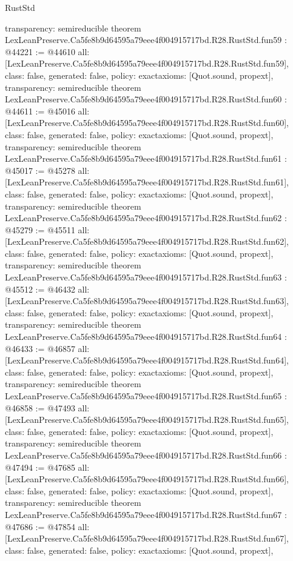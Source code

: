\begin{lexlean}{RustStd}
\begin{coremodule}
{  transparency: semireducible
}
theorem LexLeanPreserve.Ca5fe8b9d64595a79eee4f004915717bd.R28.RustStd.fun59 : @44221 := @44610 {
  all: [LexLeanPreserve.Ca5fe8b9d64595a79eee4f004915717bd.R28.RustStd.fun59],
  class: false,
  generated: false,
  policy: exact{axioms: [Quot.sound, propext]},
  transparency: semireducible
}
theorem LexLeanPreserve.Ca5fe8b9d64595a79eee4f004915717bd.R28.RustStd.fun60 : @44611 := @45016 {
  all: [LexLeanPreserve.Ca5fe8b9d64595a79eee4f004915717bd.R28.RustStd.fun60],
  class: false,
  generated: false,
  policy: exact{axioms: [Quot.sound, propext]},
  transparency: semireducible
}
theorem LexLeanPreserve.Ca5fe8b9d64595a79eee4f004915717bd.R28.RustStd.fun61 : @45017 := @45278 {
  all: [LexLeanPreserve.Ca5fe8b9d64595a79eee4f004915717bd.R28.RustStd.fun61],
  class: false,
  generated: false,
  policy: exact{axioms: [Quot.sound, propext]},
  transparency: semireducible
}
theorem LexLeanPreserve.Ca5fe8b9d64595a79eee4f004915717bd.R28.RustStd.fun62 : @45279 := @45511 {
  all: [LexLeanPreserve.Ca5fe8b9d64595a79eee4f004915717bd.R28.RustStd.fun62],
  class: false,
  generated: false,
  policy: exact{axioms: [Quot.sound, propext]},
  transparency: semireducible
}
theorem LexLeanPreserve.Ca5fe8b9d64595a79eee4f004915717bd.R28.RustStd.fun63 : @45512 := @46432 {
  all: [LexLeanPreserve.Ca5fe8b9d64595a79eee4f004915717bd.R28.RustStd.fun63],
  class: false,
  generated: false,
  policy: exact{axioms: [Quot.sound, propext]},
  transparency: semireducible
}
theorem LexLeanPreserve.Ca5fe8b9d64595a79eee4f004915717bd.R28.RustStd.fun64 : @46433 := @46857 {
  all: [LexLeanPreserve.Ca5fe8b9d64595a79eee4f004915717bd.R28.RustStd.fun64],
  class: false,
  generated: false,
  policy: exact{axioms: [Quot.sound, propext]},
  transparency: semireducible
}
theorem LexLeanPreserve.Ca5fe8b9d64595a79eee4f004915717bd.R28.RustStd.fun65 : @46858 := @47493 {
  all: [LexLeanPreserve.Ca5fe8b9d64595a79eee4f004915717bd.R28.RustStd.fun65],
  class: false,
  generated: false,
  policy: exact{axioms: [Quot.sound, propext]},
  transparency: semireducible
}
theorem LexLeanPreserve.Ca5fe8b9d64595a79eee4f004915717bd.R28.RustStd.fun66 : @47494 := @47685 {
  all: [LexLeanPreserve.Ca5fe8b9d64595a79eee4f004915717bd.R28.RustStd.fun66],
  class: false,
  generated: false,
  policy: exact{axioms: [Quot.sound, propext]},
  transparency: semireducible
}
theorem LexLeanPreserve.Ca5fe8b9d64595a79eee4f004915717bd.R28.RustStd.fun67 : @47686 := @47854 {
  all: [LexLeanPreserve.Ca5fe8b9d64595a79eee4f004915717bd.R28.RustStd.fun67],
  class: false,
  generated: false,
  policy: exact{axioms: [Quot.sound, propext]},
}
\end{coremodule}
\end{lexlean}
